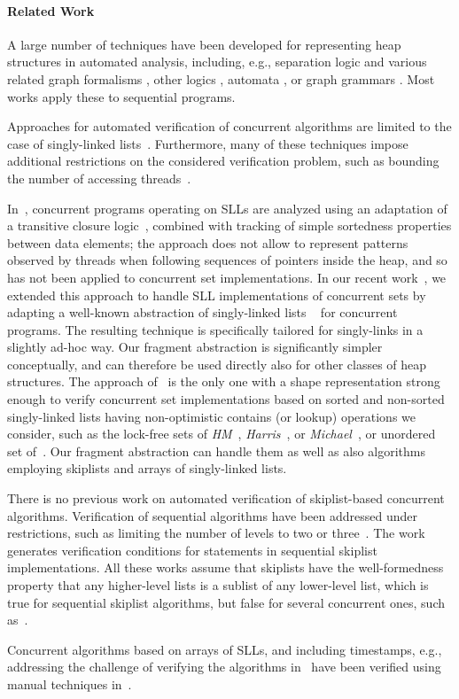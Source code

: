 \paragraph{Related Work}
A large number of techniques have been developed for representing heap structures
in automated analysis, including,
e.g., separation logic and various related graph formalisms
\cite{InvaderCAV08,thor10,rival11,dudka13}, other logics \cite{Sagiv02,pale97},
automata \cite{habermehl:forest}, or graph grammars \cite{juggrnaut10}. 
Most works apply these to sequential programs.

Approaches for automated verification of concurrent algorithms are limited to the
case of singly-linked
lists~\cite{AHHR:integrated,meyer:vmcai16,Quy:sas16,Sagiv:correlation,Vafeiadis:cav10}.
Furthermore, many of these techniques impose additional restrictions on the considered verification problem, such as bounding the number of accessing
threads~\cite{Amit:comparisonAbstraction,Vechev:spin09,CernyRZCA:CAV10}.

In~\cite{haziza:tacas13}, concurrent programs operating on SLLs are analyzed
using an adaptation of a transitive closure logic~\cite{BiRa:vmcai06}, combined with
tracking of simple sortedness properties between data elements; the approach does
not allow to represent patterns observed by threads when following sequences of
pointers inside the heap, and so has not been applied to concurrent set
implementations.
In our recent work~\cite{Quy:sas16}, we extended this approach to handle SLL implementations
of concurrent sets by adapting a
well-known abstraction of singly-linked lists ~\cite{MYRS:Canonical} for concurrent programs.
The resulting technique is specifically tailored for singly-links in a slightly ad-hoc way.
Our fragment abstraction is significantly simpler conceptually, and can therefore be used directly
also for other classes of heap structures.
The approach of~\cite{Quy:sas16} is the only one with a shape representation strong enough to
verify  concurrent set
implementations based on sorted and non-sorted
singly-linked lists having non-optimistic contains (or lookup) operations we consider, such as
the lock-free sets of {\it HM}~\cite{ArtOfMpP},
{\it Harris}~\cite{Harris:list}, or {\it Michael}~\cite{Michael:list},
or unordered set of~\cite{Zhang:unorderedlist}. Our fragment abstraction can handle them
as well as also algorithms employing skiplists and arrays of singly-linked lists.

There is no previous work on automated verification of skiplist-based concurrent algorithms.
Verification of sequential algorithms have been addressed under restrictions, such as limiting the
number of levels to two or three~\cite{boxes13,Quy:atva13:journal}. The work~\cite{Sanchez:skiplists}
generates verification conditions for statements in sequential skiplist implementations. All these
works assume that skiplists have the well-formedness property that any higher-level lists is a
sublist of any lower-level list, which is true for sequential skiplist algorithms, but false for
several concurrent ones, such as~\cite{ArtOfMpP,Linden:opodis13}.

Concurrent algorithms based on arrays of SLLs, and including timestamps, e.g., addressing
the challenge of verifying the algorithms in~\cite{ts-stack} have been verified using manual
techniques in~\cite{Khyzha:esop17,singh:issre16}.




